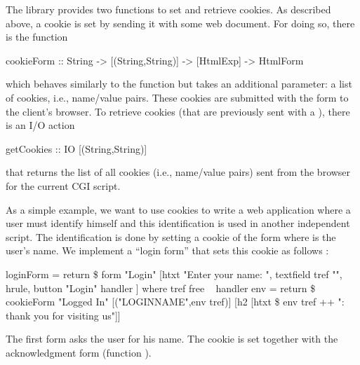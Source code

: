 The library  provides two functions to set
and retrieve cookies.
As described above, a cookie is set by sending it with some
web document. For doing so, there is the function
%
\begin{prog}
cookieForm :: String -> [(String,String)] -> [HtmlExp] -> HtmlForm
\end{prog}
%
which behaves similarly to the function  but
takes an additional parameter: a list of cookies, i.e.,
name/value pairs. These cookies are submitted with the form
to the client's browser. To retrieve cookies (that are previously sent
with a ), there is an I/O action
%
\begin{prog}
getCookies :: IO [(String,String)]
\end{prog}
%
that returns the list of all cookies (i.e., name/value pairs)
sent from the browser for the current CGI script.

As a simple example, we want to use cookies to write a web application
where a user must identify himself and this identification is used
in another independent script. The identification is done
by setting a cookie of the form 
where  is the user's name.
We implement a ``login form'' that sets this cookie as follows
:
\begin{prog}
loginForm = return \$ form "Login"
  [htxt "Enter your name: ", textfield tref "",
   hrule,
   button "Login" handler
  ]
 where
   tref free
~
   handler env = return \$
     cookieForm "Logged In"
                [("LOGINNAME",env tref)]
                [h2 [htxt \$ env tref ++ ": thank you for visiting us"]]
\end{prog}
The first form asks the user for his name.
The cookie is set together with the acknowledgment form
(function ).

